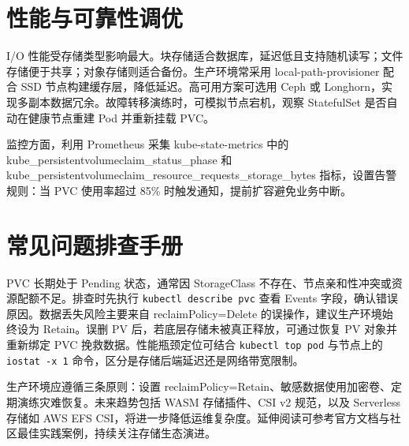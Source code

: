 \chapter{性能与可靠性调优}
I/O 性能受存储类型影响最大。块存储适合数据库，延迟低且支持随机读写；文件存储便于共享；对象存储则适合备份。生产环境常采用 local-path-provisioner 配合 SSD 节点构建缓存层，降低延迟。高可用方案可选用 Ceph 或 Longhorn，实现多副本数据冗余。故障转移演练时，可模拟节点宕机，观察 StatefulSet 是否自动在健康节点重建 Pod 并重新挂载 PVC。\par
监控方面，利用 Prometheus 采集 kube-state-metrics 中的 kube\_{}persistentvolumeclaim\_{}status\_{}phase 和 kube\_{}persistentvolumeclaim\_{}resource\_{}requests\_{}storage\_{}bytes 指标，设置告警规则：当 PVC 使用率超过 85\%{} 时触发通知，提前扩容避免业务中断。\par
\chapter{常见问题排查手册}
PVC 长期处于 Pending 状态，通常因 StorageClass 不存在、节点亲和性冲突或资源配额不足。排查时先执行 \texttt{kubectl describe pvc} 查看 Events 字段，确认错误原因。数据丢失风险主要来自 reclaimPolicy=Delete 的误操作，建议生产环境始终设为 Retain。误删 PV 后，若底层存储未被真正释放，可通过恢复 PV 对象并重新绑定 PVC 挽救数据。性能瓶颈定位可结合 \texttt{kubectl top pod} 与节点上的 \texttt{iostat -x 1} 命令，区分是存储后端延迟还是网络带宽限制。\par
生产环境应遵循三条原则：设置 reclaimPolicy=Retain、敏感数据使用加密卷、定期演练灾难恢复。未来趋势包括 WASM 存储插件、CSI v2 规范，以及 Serverless 存储如 AWS EFS CSI，将进一步降低运维复杂度。延伸阅读可参考官方文档与社区最佳实践案例，持续关注存储生态演进。\par
